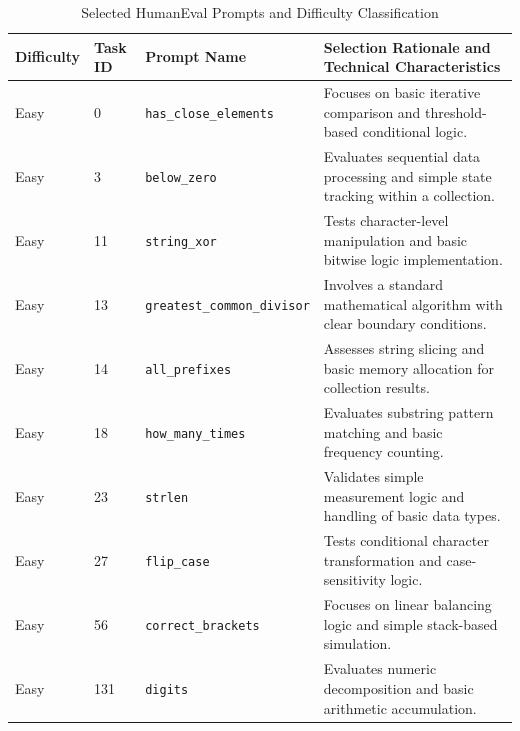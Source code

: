 \documentclass[journal]{IEEEtran}
\begin{document}
\begin{table}[!t]
\renewcommand{\arraystretch}{1.2}
\caption{Selected HumanEval Prompts and Difficulty Classification}
\label{tab:selected-prompts}
\centering
\footnotesize
\begin{tabular}{p{}p{}p{}p{}}
\toprule
\textbf{Difficulty} & \textbf{Task ID} & \textbf{Prompt Name} & \textbf{Selection Rationale and Technical Characteristics} \\
\midrule

Easy & 0 & \texttt{has\_close\_elements} & Focuses on basic iterative comparison and threshold-based conditional logic. \\
Easy & 3 & \texttt{below\_zero} & Evaluates sequential data processing and simple state tracking within a collection. \\
Easy & 11 & \texttt{string\_xor} & Tests character-level manipulation and basic bitwise logic implementation. \\
Easy & 13 & \texttt{greatest\_common\_divisor} & Involves a standard mathematical algorithm with clear boundary conditions. \\
Easy & 14 & \texttt{all\_prefixes} & Assesses string slicing and basic memory allocation for collection results. \\
Easy & 18 & \texttt{how\_many\_times} & Evaluates substring pattern matching and basic frequency counting. \\
Easy & 23 & \texttt{strlen} & Validates simple measurement logic and handling of basic data types. \\
Easy & 27 & \texttt{flip\_case} & Tests conditional character transformation and case-sensitivity logic. \\
Easy & 56 & \texttt{correct\_brackets} & Focuses on linear balancing logic and simple stack-based simulation. \\
Easy & 131 & \texttt{digits} & Evaluates numeric decomposition and basic arithmetic accumulation. \\

\midrule


\end{tabular}
\end{table}
\end{document}
